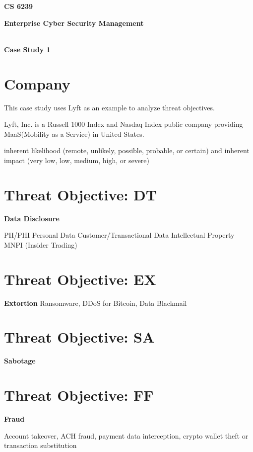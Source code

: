 \documentclass[11pt]{article}
\date{}
\begin{document}
\vspace{-5cm}


\begin{center}
\textbf{\Large CS 6239}

\textbf{\Large Enterprise Cyber Security Management}

\textbf{\\ \Large Case Study 1}
\end{center}

\section{Company}

This case study uses Lyft as an example to analyze threat objectives.

Lyft, Inc. is a Russell 1000 Index and Nasdaq Index public company providing MaaS(Mobility as a Service) in United States.

\begin{boxB}
    inherent likelihood (remote, unlikely, possible, probable, or certain) and inherent impact (very low, low, medium, high, or severe)
\end{boxB}

\section{Threat Objective: DT}
\textbf{Data Disclosure}

PII/PHI Personal Data
Customer/Transactional Data
Intellectual Property
MNPI (Insider Trading)


\section{Threat Objective: EX}

\textbf{Extortion}
Ransomware, DDoS for Bitcoin, Data Blackmail

\section{Threat Objective: SA}
\textbf{Sabotage}





\section{Threat Objective: FF}
\textbf{Fraud}


Account takeover, ACH fraud, payment data interception, 
crypto wallet theft or transaction substitution
\end{document}

